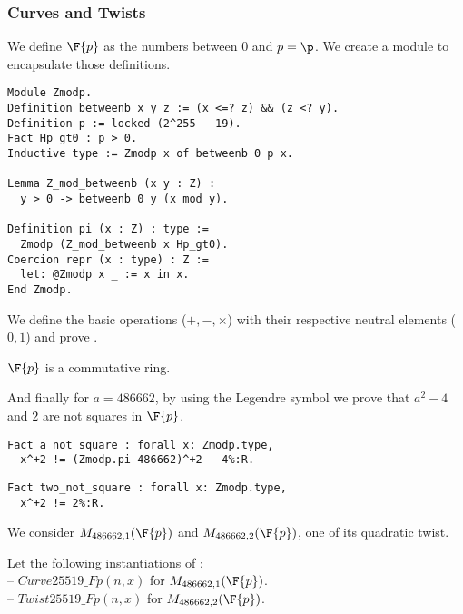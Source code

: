 \subsubsection{Curves and Twists}

We define $\F{p}$ as the numbers between $0$ and $p = \p$.
We create a  module to encapsulate those definitions.
\begin{lstlisting}[language=Coq]
Module Zmodp.
Definition betweenb x y z := (x <=? z) && (z <? y).
Definition p := locked (2^255 - 19).
Fact Hp_gt0 : p > 0.
Inductive type := Zmodp x of betweenb 0 p x.

Lemma Z_mod_betweenb (x y : Z) :
  y > 0 -> betweenb 0 y (x mod y).

Definition pi (x : Z) : type :=
  Zmodp (Z_mod_betweenb x Hp_gt0).
Coercion repr (x : type) : Z :=
  let: @Zmodp x _ := x in x.
End Zmodp.
\end{lstlisting}

We define the basic operations ($+, -, \times$) with their respective neutral
elements ($0, 1$) and prove .
\begin{lemma}
  \label{lemma:Zmodp_ring}
  $\F{p}$ is a commutative ring.
\end{lemma}
And finally for $a = 486662$, by using the Legendre symbol we prove that
$a^2 - 4$ and $2$ are not squares in $\F{p}$.
\begin{lstlisting}[language=Coq]
Fact a_not_square : forall x: Zmodp.type,
  x^+2 != (Zmodp.pi 486662)^+2 - 4%:R.
\end{lstlisting}
\begin{lstlisting}[language=Coq,label=two_not_square]
Fact two_not_square : forall x: Zmodp.type,
  x^+2 != 2%:R.
\end{lstlisting}
We consider $M_{486662,1}(\F{p})$ and $M_{486662,2}(\F{p})$, one of its quadratic twist.
\begin{dfn}Let the following instantiations of :\\
-- $Curve25519\_Fp(n,x)$ for $M_{486662,1}(\F{p})$.\\
-- $Twist25519\_Fp(n,x)$ for $M_{486662,2}(\F{p})$.
\end{dfn}

